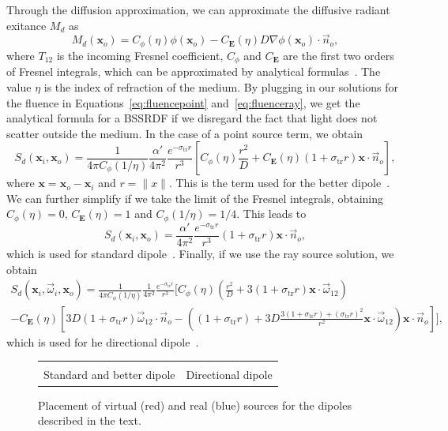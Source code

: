 Through the diffusion approximation, we can approximate the diffusive radiant exitance $M_d$ as
\begin{equation*}
M_d(\mathbf{x}_o) =  C_\phi(\eta) \phi(\mathbf{x}_o) - C_\mathbf{E}(\eta) D \nabla\phi(\mathbf{x}_o) \cdot \vec{n}_o,
\end{equation*}
where $T_{12}$ is the incoming Fresnel coefficient, $C_\phi$ and $C_\mathbf{E}$ are the first two orders of Fresnel integrals, which can be approximated by analytical formulas~\cite{dEon2011}. The value $\eta$ is the index of refraction of the medium. By plugging in our solutions for the fluence in Equations~\ref{eq:fluencepoint} and~\ref{eq:fluenceray}, we get the analytical formula for a BSSRDF if we disregard the fact that light does not scatter outside the medium. In the case of a point source term, we obtain
\begin{equation*}
S_d(\mathbf{x}_i, \mathbf{x}_o)  = \frac{1}{4\pi C_\phi(1/\eta)} \frac{\alpha'}{4 \pi^2} \frac{e^{-\sigma_\text{tr} r}}{r^3} \left[ C_\phi(\eta) \frac{r^2}{D} + C_\mathbf{E}(\eta) (1 + \sigma_\text{tr} r) \mathbf{x} \cdot \vec{n}_o \right],
\end{equation*}
where $\mathbf{x} = \mathbf{x}_o - \mathbf{x}_i$ and $r = \|x\|$. This is the term used for the better dipole~\cite{dEon2012}. We can further simplify if we take the limit of the Fresnel integrals, obtaining $C_\phi(\eta) = 0$, $C_\mathbf{E}(\eta) = 1$ and $C_\phi(1/\eta) = 1/4$. This leads to
\begin{equation*}
S_d(\mathbf{x}_i, \mathbf{x}_o)  =  \frac{\alpha'}{4 \pi^2} \frac{e^{-\sigma_\text{tr} r}}{r^3} (1 + \sigma_\text{tr} r) \mathbf{x} \cdot \vec{n}_o,
\end{equation*}
which is used for standard dipole~\cite{Jensen2001}. Finally, if we use the ray source solution, we obtain
\begin{multline*}
S_d(\mathbf{x}_i, \vec{\omega}_i, \mathbf{x}_o)  = \frac{1}{4\pi C_\phi(1/\eta)} \frac{1}{4 \pi^2} \frac{e^{-\sigma_\text{tr} r}}{r^3} \bigg[ C_\phi(\eta) (\frac{r^2}{D} +  3 (1 + \sigma_\text{tr} r) \mathbf{x}\cdot\vec{\omega}_{12} ) \\ - C_\mathbf{E}(\eta) \left[3D (1 + \sigma_\text{tr} r) \vec{\omega}_{12} \cdot \vec{n}_o - \left((1 + \sigma_\text{tr} r) + 3D \frac{3 (1 + \sigma_\text{tr} r)  + (\sigma_\text{tr} r)^2}{r^2}\mathbf{x}\cdot\vec{\omega}_{12}\right) \mathbf{x} \cdot \vec{n}_o\right] \bigg],
\end{multline*}
which is used for he directional dipole~\cite{Frisvad2014}. 
%
\begin{figure}
\centering
\begin{tabular}{@{}c@{\hskip 1em}c@{}}
\def\svgwidth{0.5\textwidth} &  \def\svgwidth{0.5\textwidth} \\
Standard and better dipole &  Directional dipole \\
\end{tabular}
\caption{Placement of virtual (red) and real (blue) sources for the dipoles described in the text.} 
\label{fig:bssrdfsources}
\end{figure}
